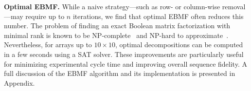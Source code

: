 \textbf{Optimal EBMF.}
While a naive strategy—such as row- or column-wise removal—may require up to $n$ iterations, we find that optimal EBMF often reduces this number. The problem of finding an exact Boolean matrix factorization with minimal rank is known to be NP-complete~\cite{orlin_contentment_1977} and NP-hard to approximate~\cite{gruber_inapproximability_2007}. Nevertheless, for arrays up to $10 \times 10$, optimal decompositions can be computed in a few seconds using a SAT solver. These improvements are particularly useful for minimizing experimental cycle time and improving overall sequence fidelity. A full discussion of the EBMF algorithm and its implementation is presented in Appendix.

